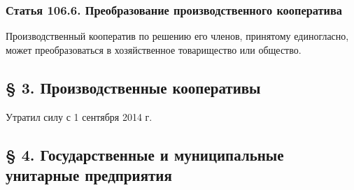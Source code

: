 \documentclass{report}
\begin{document}
\subsubsection{{\bf Статья 106.6.} Преобразование производственного кооператива}
\par Производственный кооператив по решению его членов, принятому единогласно, может преобразоваться в хозяйственное товарищество или общество.
\subsection{{\bf § 3.} Производственные кооперативы}
\par Утратил силу с 1 сентября 2014 г.
\subsection{{\bf § 4. Государственные и муниципальные унитарные предприятия}}
\end{document}
